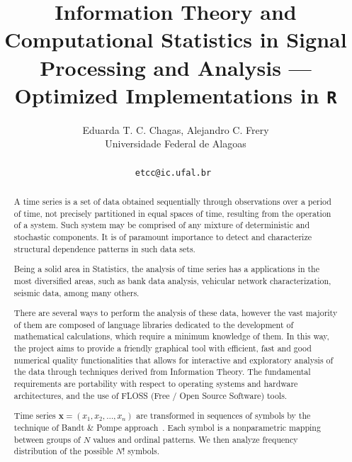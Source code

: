 \documentclass[a4paper]{article}
\date{}
\begin{document}
\thispagestyle{empty}

\title{\textbf{Information Theory and Computational Statistics in Signal Processing and Analysis --- Optimized Implementations in \texttt{R}}}

\author{Eduarda T. C. Chagas, Alejandro C. Frery \\ 
	Universidade Federal de Alagoas \\ \\ 
	\tt{etcc@ic.ufal.br}
}

\date{}
\maketitle\thispagestyle{empty} 


\begin{abstract}
A time series is a set of data obtained sequentially through observations over a period of time, not precisely partitioned in equal spaces of time, resulting from the operation of a system.
Such system may be comprised of any mixture of deterministic and stochastic components. 
It is of paramount importance to detect and characterize structural dependence patterns in such data sets.

Being a solid area in Statistics, the analysis of time series has a applications in the most diversified areas, such as bank data analysis, vehicular network characterization, seismic data, among many others.

There are several ways to perform the analysis of these data, however the vast majority of them are composed of language libraries dedicated to the development of mathematical calculations, which require a minimum knowledge of them.
In this way, the project aims to provide a friendly graphical tool with efficient, fast and good numerical quality functionalities that allows for interactive and exploratory analysis of the data through techniques derived from Information Theory.
The fundamental requirements are portability with respect to operating systems and hardware architectures, and the use of FLOSS (Free / Open Source Software) tools.


Time series $\bm x = (x_1, x_2, \dots, x_n)$ are transformed in sequences of symbols by the technique of Bandt \& Pompe approach~\cite{PermutationEntropyBandtPompe}.
Each symbol is a nonparametric mapping between groups of $N$ values and ordinal patterns.
We then analyze frequency distribution of the possible $N!$ symbols. 


\end{abstract}
\end{document}
